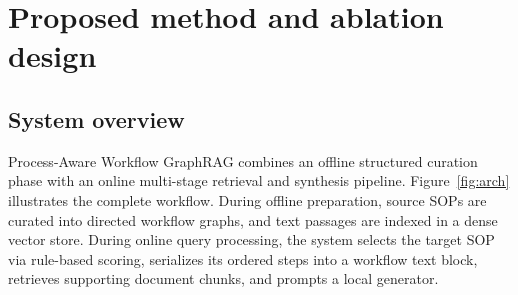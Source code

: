 \documentclass[preprint,10pt]{elsarticle}
\begin{document}
\section{Proposed method and ablation design}
\label{sec:method}

\subsection{System overview}
Process-Aware Workflow GraphRAG combines an offline structured curation phase with an online multi-stage retrieval and synthesis pipeline. Figure~\ref{fig:arch} illustrates the complete workflow. During offline preparation, source SOPs are curated into directed workflow graphs, and text passages are indexed in a dense vector store. During online query processing, the system selects the target SOP via rule-based scoring, serializes its ordered steps into a workflow text block, retrieves supporting document chunks, and prompts a local generator.
\end{document}
